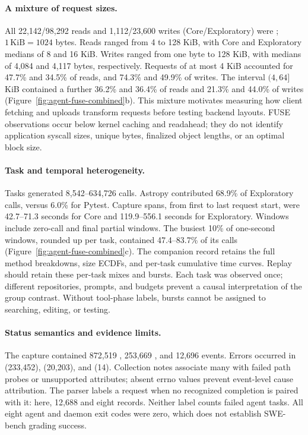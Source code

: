 \paragraph{A mixture of request sizes.}
All 22,142/98,292 reads and 1,112/23,600 writes (Core/Exploratory) were
; $1\,\mathrm{KiB}=1024$ bytes.
Reads ranged from 4 to 128 KiB, with Core and Exploratory medians of 8 and
16 KiB. Writes ranged from one byte
to 128 KiB, with medians of 4,084 and 4,117 bytes, respectively.
Requests of at most 4 KiB accounted for 47.7\% and 34.5\% of reads, and
74.3\% and 49.9\% of writes. The interval $(4,64]$ KiB contained a further
36.2\% and 36.4\% of reads and 21.3\% and 44.0\% of writes
(Figure~\ref{fig:agent-fuse-combined}b).
This mixture motivates measuring how client fetching and uploads transform
requests before testing backend layouts. FUSE observations occur below kernel
caching and readahead; they do not identify application syscall sizes, unique
bytes, finalized object lengths, or an optimal block size.

\paragraph{Task and temporal heterogeneity.}
Tasks generated 8,542--634,726 calls. Astropy contributed 68.9\% of
Exploratory calls, versus 6.0\% for Pytest. Capture spans, from first to last
request start, were 42.7--71.3 seconds for Core and 119.9--556.1 seconds for
Exploratory. Windows include zero-call and final partial windows.
The busiest 10\% of one-second windows, rounded up per task,
contained 47.4--83.7\% of its calls (Figure~\ref{fig:agent-fuse-combined}c).
The companion record retains the full method breakdowns, size ECDFs,
and per-task cumulative time curves. Replay
should retain these per-task mixes and bursts. Each task was observed once;
different repositories, prompts, and budgets prevent a causal interpretation
of the group contrast. Without tool-phase labels, bursts cannot be assigned
to searching, editing, or testing.

\paragraph{Status semantics and evidence limits.}
The capture contained 872,519 , 253,669 , and 12,696
 events. Errors occurred in  (233,452),
 (20,203), and  (14). Collection notes associate
many with failed path probes or unsupported attributes; absent errno values
prevent event-level cause attribution. The parser labels a request
 when no recognized completion is paired with it: here,
12,688  and eight  records. Neither label counts
failed agent tasks. All eight agent and daemon exit codes were zero, which
does not establish SWE-bench grading success.

